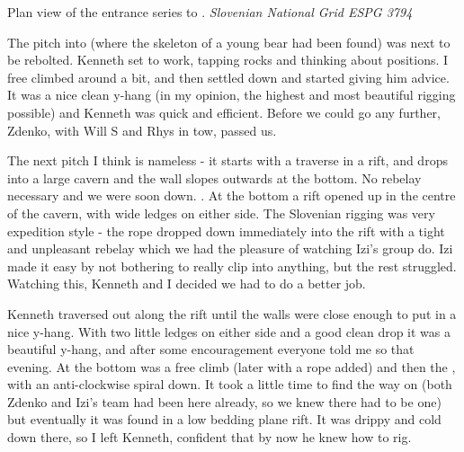 \begin{marginfigure}
 \caption{Plan view of the entrance series to \protect{}. \emph{Slovenian National Grid ESPG 3794}}
 \label{prim ent inset}
\end{marginfigure}

The pitch into  (where the skeleton of a young bear had been found) was next to be rebolted. Kenneth set to work, tapping rocks and thinking about positions. I free climbed around a bit, and then settled down and started giving him advice. It was a nice clean y-hang (in my opinion, the highest and most beautiful rigging possible) and Kenneth was quick and efficient. Before we could go any further, Zdenko, with Will S and Rhys in tow, passed us.

The next pitch I think is nameless - it starts with a traverse in a rift, and drops into a large cavern and the wall slopes outwards at the bottom. No rebelay necessary and we were soon down. . At the bottom a rift opened up in the centre of the cavern, with wide ledges on either side. The Slovenian rigging was very expedition style - the rope dropped down immediately into the rift with a tight and unpleasant rebelay which we had the pleasure of watching Izi’s group do. Izi made it easy by not bothering to really clip into anything, but the rest struggled. Watching this, Kenneth and I decided we had to do a better job.

Kenneth traversed out along the rift until the walls were close enough to put in a nice y-hang. With two little ledges on either side and a good clean drop it was a beautiful y-hang, and after some encouragement everyone told me so that evening. At the bottom was a free climb (later with a rope added) and then the , with an anti-clockwise spiral down. It took a little time to find the way on (both Zdenko and Izi’s team had been here already, so we knew there had to be one) but eventually it was found in a low bedding plane rift. It was drippy and cold down there, so I left Kenneth, confident that by now he knew how to rig.

